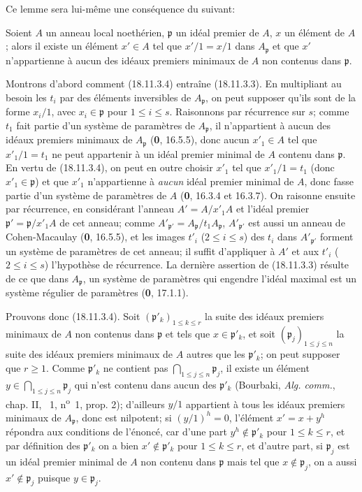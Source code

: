 Ce lemme sera lui-même une conséquence du suivant:

\begin{lemma}[18.11.3.4]
\label{IV.18.11.3.4}
Soient $A$ un anneau local noethérien, $\mathfrak p$ un idéal premier de $A$, $x$ un élément de $A$; alors il existe un élément $x'\in A$ tel que $x'/1=x/1$ dans $A_{\mathfrak p}$ et que $x'$ n'appartienne à aucun des idéaux premiers minimaux de $A$ non contenus dans $\mathfrak p$.
\end{lemma}

Montrons d'abord comment (18.11.3.4) entraîne (18.11.3.3). En multipliant au besoin les $t_i$ par des éléments inversibles de $A_{\mathfrak p}$, on peut supposer qu'ils sont de la forme $x_i/1$, avec $x_i\in\mathfrak p$ pour $1\leq i\leq s$. Raisonnons par récurrence sur $s$; comme $t_1$ fait partie d'un système de paramètres de $A_{\mathfrak p}$, il n'appartient à aucun des idéaux premiers minimaux de $A_{\mathfrak p}$ (\textbf{0}, 16.5.5), donc aucun $x'_1\in A$ tel que $x'_1/1=t_1$ ne peut appartenir à un idéal premier minimal de $A$ contenu dans $\mathfrak p$. En vertu de (18.11.3.4), on peut en outre choisir $x'_1$ tel que $x'_1/1=t_1$ (donc $x'_1\in\mathfrak p$) et que $x'_1$ n'appartienne à \emph{aucun} idéal premier minimal de $A$, donc fasse partie d'un système de paramètres de $A$ (\textbf{0}, 16.3.4 et 16.3.7). On raisonne ensuite par récurrence, en considérant l'anneau $A'=A/x'_1A$ et l'idéal premier $\mathfrak p'=\mathfrak p/x'_1A$ de cet anneau; comme $A'_{\mathfrak p'}=A_{\mathfrak p}/t_1A_{\mathfrak p}$, $A'_{\mathfrak p'}$ est aussi un anneau de Cohen-Macaulay (\textbf{0}, 16.5.5), et les images $t'_i$ ($2\leq i\leq s$) des $t_i$ dans $A'_{\mathfrak p'}$ forment un système de paramètres de cet anneau; il suffit d'appliquer à $A'$ et aux $t'_i$ ($2\leq i\leq s$) l'hypothèse de récurrence. La dernière assertion de (18.11.3.3) résulte de ce que dans $A_{\mathfrak p}$, un système de paramètres qui engendre l'idéal maximal est un système régulier de paramètres (\textbf{0}, 17.1.1).

Prouvons donc (18.11.3.4). Soit $(\mathfrak p'_k)_{1\leq k\leq r}$ la suite des idéaux premiers minimaux de $A$ non contenus dans $\mathfrak p$ et tels que $x\in\mathfrak p'_k$, et soit $(\mathfrak p_j)_{1\leq j\leq n}$ la suite des idéaux premiers minimaux de $A$ autres que les $\mathfrak p'_k$; on peut supposer que $r\geq1$. Comme $\mathfrak p'_k$ ne contient pas $\bigcap_{1\leq j\leq n}\mathfrak p_j$, il existe un élément $y\in\bigcap_{1\leq j\leq n}\mathfrak p_j$ qui n'est contenu dans aucun des $\mathfrak p'_k$ (Bourbaki, \emph{Alg. comm.}, chap. II, \textsection~1, n\textsuperscript{o}~1, prop. 2); d'ailleurs $y/1$ appartient à tous les idéaux premiers minimaux de $A_{\mathfrak p}$, donc est nilpotent; si $(y/1)^h=0$, l'élément $x'=x+y^h$ répondra aux conditions de l'énoncé, car d'une part $y^h\notin\mathfrak p'_k$ pour $1\leq k\leq r$, et par définition des $\mathfrak p'_k$ on a bien $x'\notin\mathfrak p'_k$ pour $1\leq k\leq r$, et d'autre part, si $\mathfrak p_j$ est un idéal premier minimal de $A$ non contenu dans $\mathfrak p$ mais tel que $x\notin\mathfrak p_j$, on a aussi $x'\notin\mathfrak p_j$ puisque $y\in\mathfrak p_j$.

